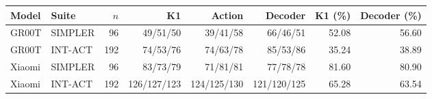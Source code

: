 \begin{tabular}{llrrrrrr}
\toprule
Model & Suite & $n$ & K1 & Action & Decoder & K1 (\%) & Decoder (\%) \\
\midrule
GR00T & SIMPLER & 96 & 49/51/50 & 39/41/58 & 66/46/51 & 52.08 & 56.60 \\
GR00T & INT-ACT & 192 & 74/53/76 & 74/63/78 & 85/53/86 & 35.24 & 38.89 \\
Xiaomi & SIMPLER & 96 & 83/73/79 & 71/81/81 & 77/78/78 & 81.60 & 80.90 \\
Xiaomi & INT-ACT & 192 & 126/127/123 & 124/125/130 & 121/120/125 & 65.28 & 63.54 \\
\bottomrule
\end{tabular}
